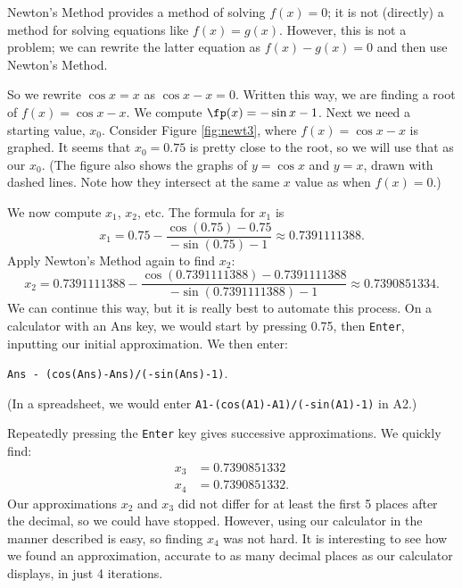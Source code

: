 {Newton's Method provides a method of solving $f(x) = 0$; it is not (directly) a method for solving equations like $f(x) = g(x)$. However, this is not a problem; we can rewrite the latter equation as $f(x) - g(x)=0$ and then use Newton's Method. 

So we rewrite $\cos x=x$ as $\cos{x}-x=0$.  Written this way, we are finding a root of $f(x)=\cos{x}-x$.  We compute $\fp(x)=-\sin{x} - 1$.  Next we need a starting value, $x_0$.  Consider Figure \ref{fig:newt3}, where $f(x) = \cos x-x$ is graphed. It seems that $x_0=0.75$ is pretty close to the root, so we will use that as our $x_0$. (The figure also shows the graphs of $y=\cos x$ and $y=x$, drawn with dashed lines. Note how they intersect at the same $x$ value as when $f(x) = 0$.)


We now compute $x_1$, $x_2$, etc.  The formula for $x_1$ is 
$$x_1 = 0.75 - \frac{\cos(0.75)-0.75}{-\sin(0.75)-1}\approx 0.7391111388.$$
Apply Newton's Method again to find $x_2$:
$$x_2 = 0.7391111388 - \frac{\cos(0.7391111388)-0.7391111388}{-\sin(0.7391111388)-1}\approx 0.7390851334.$$
We can continue this way, but it is really best to automate this process.  On a calculator with an Ans key, we would start by pressing 0.75, then \texttt{Enter}, inputting our initial approximation. We then enter:
\begin{center}\texttt{Ans - (cos(Ans)-Ans)/(-sin(Ans)-1)}.\end{center}
(In a spreadsheet, we would enter \texttt{A1-(cos(A1)-A1)/(-sin(A1)-1)} in A2.)

Repeatedly pressing the \texttt{Enter} key gives successive approximations.  We quickly find:
\begin{align*}
x_3 &= 0.7390851332\\
x_4 &= 0.7390851332.
\end{align*}
Our approximations $x_2$ and $x_3$ did not differ for at least the first 5 places after the decimal, so we could have stopped. However, using our calculator in the manner described is easy, so finding $x_4$ was not hard. It is interesting to see how we found an approximation, accurate to as many decimal places as our calculator displays, in just 4 iterations.
}\\

